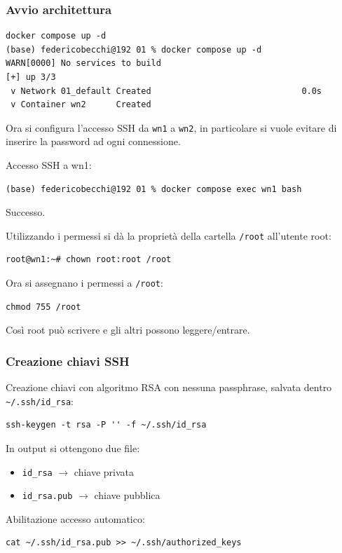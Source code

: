 \documentclass[11pt,a4paper]{article}
\begin{document}
\subsubsection{Avvio architettura}

\begin{lstlisting}
docker compose up -d
(base) federicobecchi@192 01 % docker compose up -d
WARN[0000] No services to build
[+] up 3/3
 v Network 01_default Created                              0.0s
 v Container wn2      Created
\end{lstlisting}

Ora si configura l'accesso SSH da \texttt{wn1} a \texttt{wn2}, in particolare si vuole evitare di inserire la password ad ogni connessione.

Accesso SSH a wn1:
\begin{lstlisting}
(base) federicobecchi@192 01 % docker compose exec wn1 bash
\end{lstlisting}
Successo.

Utilizzando i permessi si dà la proprietà della cartella \texttt{/root} all'utente root:
\begin{lstlisting}
root@wn1:~# chown root:root /root
\end{lstlisting}

Ora si assegnano i permessi a \texttt{/root}:
\begin{lstlisting}
chmod 755 /root
\end{lstlisting}
Così root può scrivere e gli altri possono leggere/entrare.

\subsubsection{Creazione chiavi SSH}

Creazione chiavi con algoritmo RSA con nessuna passphrase, salvata dentro \texttt{\textasciitilde/.ssh/id\_rsa}:

\begin{lstlisting}
ssh-keygen -t rsa -P '' -f ~/.ssh/id_rsa
\end{lstlisting}

In output si ottengono due file:
\begin{itemize}
    \item \texttt{id\_rsa} $\rightarrow$ chiave privata
    \item \texttt{id\_rsa.pub} $\rightarrow$ chiave pubblica
\end{itemize}

Abilitazione accesso automatico:
\begin{lstlisting}
cat ~/.ssh/id_rsa.pub >> ~/.ssh/authorized_keys
\end{lstlisting}
\end{document}
